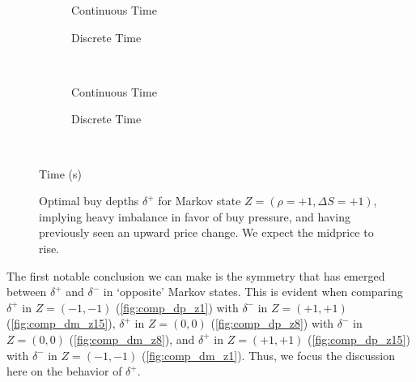 \begin{figure}
\centering
\begin{subfigure}{.45\linewidth}
  \centering
  \setlength\figureheight{\linewidth} 
  \setlength\figurewidth{\linewidth}
  
  \caption{Continuous Time}
\end{subfigure}%
\hfill%
\begin{subfigure}{.45\linewidth}
  \centering
  \setlength\figureheight{\linewidth} 
  \setlength\figurewidth{\linewidth}
   
  \caption{Discrete Time}
\end{subfigure}\\
\vspace{1cm}
\begin{subfigure}{.45\linewidth}
  \centering
  \setlength\figureheight{\linewidth} 
  \setlength\figurewidth{\linewidth}
  
  \caption{Continuous Time}
\end{subfigure}%
\hfill%
\begin{subfigure}{.45\linewidth}
  \centering
  \setlength\figureheight{\linewidth} 
  \setlength\figurewidth{\linewidth}
   
  \caption{Discrete Time}
\end{subfigure}\\

\leavevmode{}\hspace{0pt plus 1filll}\null

Time (s)

\vspace{1cm}
\begin{subfigure}{\linewidth}
  \centering
   
\end{subfigure}%
  \caption{Optimal buy depths $\delta^{+}$ for Markov state $Z=(\rho = +1, \Delta S = +1)$, implying heavy imbalance in favor of buy pressure, and having previously seen an upward price change. We expect the midprice to rise.}
  \label{fig:comp_dp_z15}
\end{figure}
The first notable conclusion we can make is the symmetry that has emerged between $\delta^+$ and $\delta^-$ in `opposite' Markov states. This is evident when comparing $\delta^+$ in $Z=(-1,-1)$ (\autoref{fig:comp_dp_z1}) with $\delta^-$ in $Z=(+1,+1)$ (\autoref{fig:comp_dm_z15}), $\delta^+$ in $Z=(0,0)$ (\autoref{fig:comp_dp_z8}) with $\delta^-$ in $Z=(0,0)$ (\autoref{fig:comp_dm_z8}), and $\delta^+$ in $Z=(+1,+1)$ (\autoref{fig:comp_dp_z15}) with $\delta^-$ in $Z=(-1,-1)$ (\autoref{fig:comp_dm_z1}). Thus, we focus the discussion here on the behavior of $\delta^+$.

